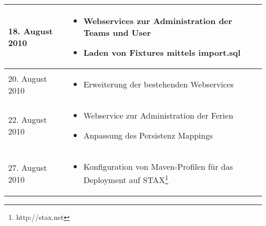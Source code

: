 \begin{spacing}{0.5}
\begin{longtable}{|p{4cm}|p{10cm}|}
  18. August 2010 & 
  \begin{itemize}
  \item Webservices zur Administration der Teams und User
  \item Laden von Fixtures mittels import.sql
  \end{itemize}\\
  \hline
  
    20. August 2010 & 
  \begin{itemize}
  \item Erweiterung der bestehenden Webservices
  \end{itemize}\\
  \hline
  
   22. August 2010 & 	
  \begin{itemize}
  \item Webservice zur Administration der Ferien
  \item Anpassung des Persistenz Mappings
  \end{itemize}\\
  \hline
   27. August 2010 & 
  \begin{itemize}
  \item Konfiguration von Maven-Profilen f\"ur das Deployment auf STAX\footnote{http://stax.net}
  \end{itemize}\\
  \hline
    \end{longtable}
\end{spacing}
  

